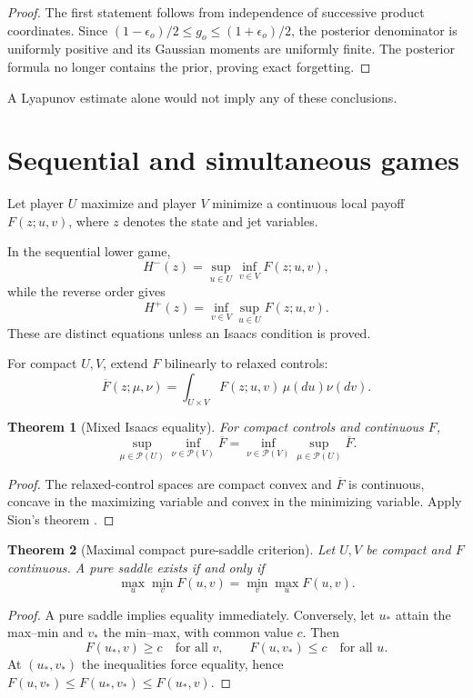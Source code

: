 \documentclass[11pt,reqno]{amsart}
\newtheorem{theorem}{Theorem}[section]
\theoremstyle{definition}
\theoremstyle{remark}
\newcommand{\cP}{\mathcal P}
\begin{document}
\begin{proof}
The first statement follows from independence of successive product
coordinates.  Since
$(1-\epsilon_o)/2\le g_o\le(1+\epsilon_o)/2$, the posterior denominator is
uniformly positive and its Gaussian moments are uniformly finite.  The
posterior formula no longer contains the prior, proving exact forgetting.
\end{proof}

A Lyapunov estimate alone would not imply any of these conclusions.

\section{Sequential and simultaneous games}\label{sec:games}

Let player $U$ maximize and player $V$ minimize a continuous local payoff
$F(z;u,v)$, where $z$ denotes the state and jet variables.

In the sequential lower game,
\[
 H^-(z)=\sup_{u\in U}\inf_{v\in V}F(z;u,v),
\]
while the reverse order gives
\[
 H^+(z)=\inf_{v\in V}\sup_{u\in U}F(z;u,v).
\]
These are distinct equations unless an Isaacs condition is proved.

For compact $U,V$, extend $F$ bilinearly to relaxed controls:
\[
 \overline F(z;\mu,\nu)
 =\int_{U\times V}F(z;u,v)\,\mu(du)\nu(dv).
\]

\begin{theorem}[Mixed Isaacs equality]\label{thm:mixed}
For compact controls and continuous $F$,
\[
 \sup_{\mu\in\cP(U)}\inf_{\nu\in\cP(V)}\overline F
 =\inf_{\nu\in\cP(V)}\sup_{\mu\in\cP(U)}\overline F.
\]
\end{theorem}

\begin{proof}
The relaxed-control spaces are compact convex and $\overline F$ is continuous,
concave in the maximizing variable and convex in the minimizing variable.
Apply Sion's theorem \cite{Sion1958}.
\end{proof}

\begin{theorem}[Maximal compact pure-saddle criterion]\label{thm:pure-iff}
Let $U,V$ be compact and $F$ continuous.  A pure saddle exists if and only if
\[
 \max_u\min_vF(u,v)=\min_v\max_uF(u,v).
\]
\end{theorem}

\begin{proof}
A pure saddle implies equality immediately.  Conversely, let $u_*$ attain the
max--min and $v_*$ the min--max, with common value $c$.  Then
\[
 F(u_*,v)\ge c\quad\text{for all }v,
 \qquad
 F(u,v_*)\le c\quad\text{for all }u.
\]
At $(u_*,v_*)$ the inequalities force equality, hence
$F(u,v_*)\le F(u_*,v_*)\le F(u_*,v)$.
\end{proof}
\end{document}
